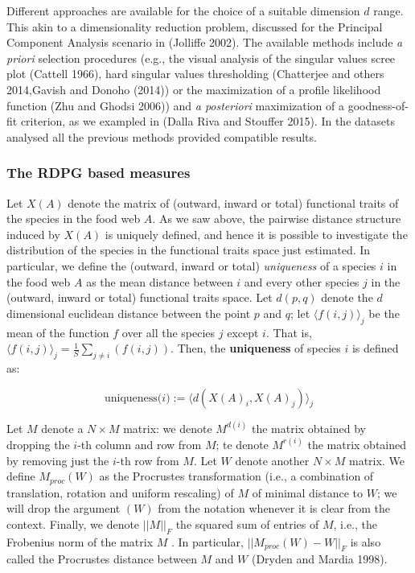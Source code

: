 \documentclass[11pt,article,oneside]{memoir}
\begin{document}
Different approaches are available for the choice of a suitable
dimension \(d\) range. This akin to a dimensionality reduction problem,
discussed for the Principal Component Analysis scenario in (Jolliffe
2002). The available methods include \emph{a priori} selection
procedures (e.g., the visual analysis of the singular values scree plot
(Cattell 1966), hard singular values thresholding (Chatterjee and others
2014,Gavish and Donoho (2014)) or the maximization of a profile
likelihood function (Zhu and Ghodsi 2006)) and \emph{a posteriori}
maximization of a goodness-of-fit criterion, as we exampled in (Dalla
Riva and Stouffer 2015). In the datasets analysed all the previous
methods provided compatible results.

\subsubsection{The RDPG based measures}\label{the-rdpg-based-measures}

Let \(X(A)\) denote the matrix of (outward, inward or total) functional
traits of the species in the food web \(A\). As we saw above, the
pairwise distance structure induced by \(X(A)\) is uniquely defined, and
hence it is possible to investigate the distribution of the species in
the functional traits space just estimated. In particular, we define the
(outward, inward or total) \emph{uniqueness} of a species \(i\) in the
food web \(A\) as the mean distance between \(i\) and every other
species \(j\) in the (outward, inward or total) functional traits space.
Let \(d\left(p,q\right)\) denote the \(d\) dimensional euclidean
distance between the point \(p\) and \(q\); let
\(\langle f(i,j) \rangle_j\) be the mean of the function \(f\) over all
the species \(j\) except \(i\). That is,
\(\langle f(i,j) \rangle_j = \frac{1}{S}\sum_{j \neq i}(f(i,j))\). Then,
the \textbf{uniqueness} of species \(i\) is defined as:

\begin{equation}
\mbox{uniqueness($i$)} := \langle d\left( X(A)_i,X(A)_j\right)\rangle_j
\end{equation}

Let \(M\) denote a \(N \times M\) matrix: we denote \(M^{d(i)}\) the
matrix obtained by dropping the \(i\)-th column and row from \(M\); te
denote \(M^{r(i)}\) the matrix obtained by removing just the \(i\)-th
row from \(M\). Let \(W\) denote another \(N \times M\) matrix. We
define \(M_{proc}(W)\) as the Procrustes transformation (i.e., a
combination of translation, rotation and uniform rescaling) of \(M\) of
minimal distance to \(W\); we will drop the argument \((W)\) from the
notation whenever it is clear from the context. Finally, we denote
\(||M||_F\) the squared sum of entries of \(M\), i.e., the Frobenius
norm of the matrix \(M\) . In particular, \(||M_{proc}(W) - W||_F\) is
also called the Procrustes distance between \(M\) and \(W\) (Dryden and
Mardia 1998).
\end{document}
